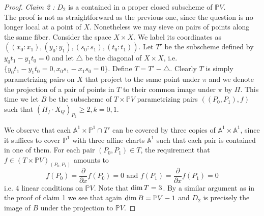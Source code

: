 \documentclass[12pt]{article}
\theoremstyle{plain}
\theoremstyle{definition}
\newcommand{\IA}{\mathbb{A}}
\newcommand{\IP}{\mathbb{P}}
\renewcommand\dim{{\rm dim\,}}
\newcommand{\<}{\langle}
\renewcommand{\>}{\rangle}
\newcommand{\p}{\partial}
\begin{document}
\begin{proof}
\textit{Claim 2 :} $D_2$ is a contained in a proper closed subscheme of $\IP V$. \\
The proof is not as straightforward as the previous one, since the question is no longer local at a point of $X$. Nonetheless we may sieve on pairs of points along the same fiber. Consider the space $ X \times X$. We label its coordinates as $((x_0 : x_1), (y_0 : y_1), (s_0 : s_1), (t_0 : t_1))$. Let $T'$ be the subscheme defined by $y_0 t_1 - y_1 t_0 = 0$ and let $\triangle$ be the diagonal of $ X \times X$, i.e. $\{y_0 t_1 - y_1 t_0 = 0, x_0 s_1 - x_1 s_0 = 0 \}$. Define $T = T' - \triangle$. Clearly $T$ is simply parametrizing pairs on $X$ that project to the same point under $\pi$ and we denote the projection of a pair of points in $T$ to their common image under $\pi$ by $\Pi$. This time we let $B$ be the subscheme of $ T \times \IP V$ parametrizing pairs $((P_0, P_1), f)$ such that $(H_f \cdot X_{Q})_{P_k} \ge 2,  k= 0, 1$. 

We observe that each $\IA^1 \times \IP^1 \cap T'$ can be covered by three copies of $\IA^1 \times \IA^1$, since it suffices to cover $\IP^1$ with three affine charts $\IA^1$ such that each pair is contained in one of them. For each pair $(P_0, P_1) \in T$, the requirement that $ f \in (T \times \IP V)_{(P_0, P_1)} $ amounts to 
$$ f(P_0) = \frac{ \p }{\p x } f (P_0) = 0 \text{ and } f(P_1) = \frac{ \p }{\p x } f (P_1) = 0$$ i.e. $4$ linear conditions on $\IP V$. Note that $\dim T = 3$. By a similar argument as in the proof of claim 1 we see that again $\dim B = \IP V - 1$ and $D_2$ is precisely the image of $B$ under the projection to $\IP V$. 

\end{proof}
\end{document}
